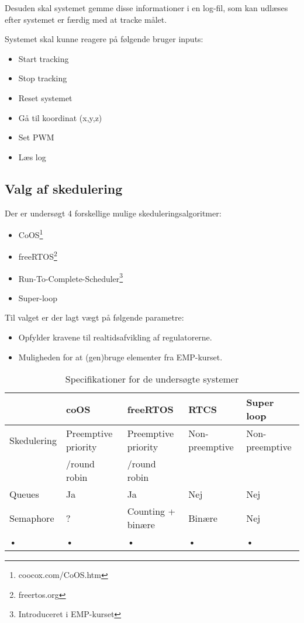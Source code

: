Desuden skal systemet gemme disse informationer i en log-fil, som kan udlæses efter systemet er færdig med at tracke målet. 

Systemet skal kunne reagere på følgende bruger inputs:


\begin{itemize}
	\item Start tracking
	\item Stop tracking
	\item Reset systemet
	\item Gå til koordinat (x,y,z)
	\item Set PWM
	\item Læs log
\end{itemize}


\subsection{Valg af skedulering}
Der er undersøgt 4 forskellige mulige skeduleringsalgoritmer: 

\begin{itemize}
	\item CoOS\footnote{coocox.com/CoOS.htm}
	\item freeRTOS\footnote{freertos.org}
	\item Run-To-Complete-Scheduler\footnote{Introduceret i EMP-kurset}
	\item Super-loop
\end{itemize}

Til valget er der lagt vægt på følgende parametre: 

\begin{itemize}
	\item Opfylder kravene til realtidsafvikling af regulatorerne. 
	\item Muligheden for at (gen)bruge elementer fra EMP-kurset.
\end{itemize}

\begin{table}[h!]
\begin{tabular}{|l|l|l|l|l|}
\hline 
 & coOS & freeRTOS & RTCS & Super loop \\ 
\hline 
Skedulering & Preemptive priority  & Preemptive priority  & Non-preemptive & Non-preemptive  \\ 
			& /round robin		&	/round robin & &	\\
\hline 
Queues & Ja & Ja & Nej & Nej \\ 
\hline 
Semaphore & ?  & Counting + binære & Binære  & Nej  \\ 
\hline 
• & • & • & • & • \\ 
\hline 
\end{tabular} 
\caption{Specifikationer for de undersøgte systemer}
\label{tb:os_comparison}
\end{table}
